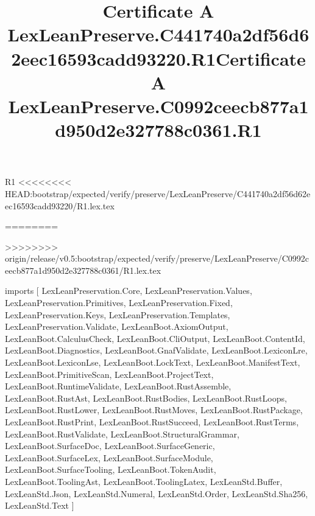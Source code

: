 \begin{lexlean}{R1}
<<<<<<<< HEAD:bootstrap/expected/verify/preserve/LexLeanPreserve/C441740a2df56d62eec16593cadd93220/R1.lex.tex
\title{Certificate A LexLeanPreserve.C441740a2df56d62eec16593cadd93220.R1}
========
\title{Certificate A LexLeanPreserve.C0992ceecb877a1d950d2e327788c0361.R1}
>>>>>>>> origin/release/v0.5:bootstrap/expected/verify/preserve/LexLeanPreserve/C0992ceecb877a1d950d2e327788c0361/R1.lex.tex
\begin{coremodule}
imports [
  LexLeanPreservation.Core,
  LexLeanPreservation.Values,
  LexLeanPreservation.Primitives,
  LexLeanPreservation.Fixed,
  LexLeanPreservation.Keys,
  LexLeanPreservation.Templates,
  LexLeanPreservation.Validate,
  LexLeanBoot.AxiomOutput,
  LexLeanBoot.CalculusCheck,
  LexLeanBoot.CliOutput,
  LexLeanBoot.ContentId,
  LexLeanBoot.Diagnostics,
  LexLeanBoot.GnafValidate,
  LexLeanBoot.LexiconLre,
  LexLeanBoot.LexiconLse,
  LexLeanBoot.LockText,
  LexLeanBoot.ManifestText,
  LexLeanBoot.PrimitiveScan,
  LexLeanBoot.ProjectText,
  LexLeanBoot.RuntimeValidate,
  LexLeanBoot.RustAssemble,
  LexLeanBoot.RustAst,
  LexLeanBoot.RustBodies,
  LexLeanBoot.RustLoops,
  LexLeanBoot.RustLower,
  LexLeanBoot.RustMoves,
  LexLeanBoot.RustPackage,
  LexLeanBoot.RustPrint,
  LexLeanBoot.RustSucceed,
  LexLeanBoot.RustTerms,
  LexLeanBoot.RustValidate,
  LexLeanBoot.StructuralGrammar,
  LexLeanBoot.SurfaceDoc,
  LexLeanBoot.SurfaceGeneric,
  LexLeanBoot.SurfaceLex,
  LexLeanBoot.SurfaceModule,
  LexLeanBoot.SurfaceTooling,
  LexLeanBoot.TokenAudit,
  LexLeanBoot.ToolingAst,
  LexLeanBoot.ToolingLatex,
  LexLeanStd.Buffer,
  LexLeanStd.Json,
  LexLeanStd.Numeral,
  LexLeanStd.Order,
  LexLeanStd.Sha256,
  LexLeanStd.Text
]


\end{coremodule}
\end{lexlean}
